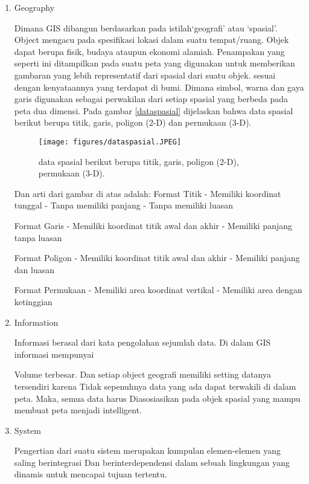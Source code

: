\begin{enumerate}
\item Geography


Dimana GIS dibangun berdasarkan pada istilah‘geografi’ atau ‘spasial’.
Object mengacu pada spesifikasi lokasi dalam suatu tempat/ruang. Objek dapat berupa fisik,
budaya ataupun ekonomi alamiah. Penampakan yang seperti ini ditampilkan pada suatu peta yang 
digunakan untuk memberikan gambaran yang lebih representatif dari spasial dari suatu objek.
sesuai dengan kenyataannya yang terdapat di bumi. Dimana simbol, warna dan gaya garis digunakan sebagai
perwakilan dari setiap spasial yang berbeda pada peta dua dimensi.
Pada gambar \ref{dataspasial} dijelaskan bahwa data spasial berikut berupa 
titik, garis, poligon (2-D) dan permukaan (3-D).


\begin{figure}[ht]
	\centerline{\texttt{[image: figures/dataspasial.JPEG]}}
	\caption{data spasial berikut berupa titik, garis, poligon (2-D), permukaan (3-D).}
	\label{data spasial}
	\end{figure}


Dan arti dari gambar di atas adalah:
Format Titik 						
- Memiliki koordinat tunggal 		
- Tanpa memiliki panjang 			
- Tanpa memiliki luasan

Format Garis
- Memiliki koordinat titik awal dan akhir		
- Memiliki panjang tanpa luasan

Format Poligon 					
- Memiliki koordinat titik awal dan akhir
- Memiliki panjang dan luasan 		

Format Permukaan
- Memiliki area koordinat vertikal
- Memiliki area dengan ketinggian


\item Information

Informasi berasal dari kata pengolahan sejumlah data. Di dalam GIS informasi mempunyai

Volume terbesar. Dan setiap object geografi memiliki setting datanya tersendiri karena 
Tidak sepenuhnya data yang ada dapat terwakili di dalam peta. Maka, semua data harus
Diasosiasikan pada objek spasial yang mampu membuat peta menjadi intelligent.


\item System

Pengertian dari suatu sistem merupakan kumpulan elemen-elemen yang saling berintegrasi 
Dan berinterdependensi dalam sebuah lingkungan yang dinamis untuk mencapai tujuan tertentu.
\end{enumerate}

